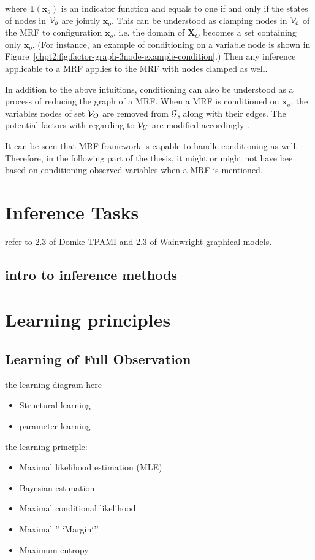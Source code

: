where $\bm{1}(\bm{x}_o)$ is an indicator function and equals to one if and only if the states of nodes in $\mathcal{V}_o$ are jointly $\bm{x}_o$. This can be understood as clamping nodes in $\mathcal{V}_o$ of the MRF to configuration $\bm{x}_o$, i.e. the domain of $\bm{X}_O$ becomes a set containing only $\bm{x}_o$. (For instance, an example of conditioning on a variable node is shown in Figure~\ref{chpt2:fig:factor-graph-3node-example-condition}.) Then any inference applicable to a MRF applies to the MRF with nodes clamped as well.

In addition to the above intuitions, conditioning can also be understood as a process of reducing the graph of a MRF. When a MRF is conditioned on $\bm{x}_o$, the variables nodes of set $\mathcal{V}_O$ are removed from $\mathcal{G}$, along with their edges. The potential factors with regarding to $\mathcal{V}_U$ are modified accordingly \cite[Chapter~4.2.3]{koller2009pgm}.

It can be seen that MRF framework is capable to handle conditioning as well. Therefore, in the following part of the thesis, it might or might not have bee based on conditioning observed variables when a MRF is mentioned.

\section{Inference Tasks}
\label{sec:background-graphial-reppresentation}
refer to 2.3 of Domke TPAMI and 2.3 of Wainwright graphical models.

\subsection{intro to inference methods}
\section{Learning principles}
\subsection{Learning of Full Observation}

the learning diagram here
\begin{itemize}
\item Structural learning
\item parameter learning
\end{itemize}


the learning principle:
\begin{itemize}
\item Maximal likelihood estimation (MLE)
\item Bayesian estimation
\item Maximal conditional likelihood
\item Maximal '' `Margin`''
\item Maximum entropy
\end{itemize}


